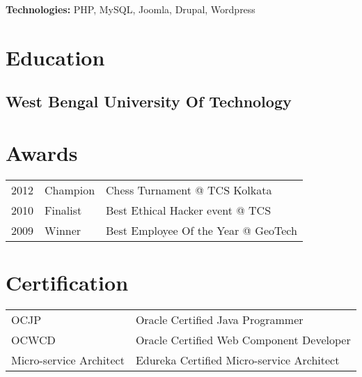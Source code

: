 \documentclass[]{deedy-resume-openfont}
\begin{document}
\begin{minipage}[t]{0.66\textwidth}
\vspace{\topsep}
\begin{tightemize}
\item \textbf{Technologies:} PHP, MySQL, Joomla, Drupal, Wordpress
\end{tightemize}
\sectionsep



\section{Education} 

\subsection{West Bengal University Of Technology}
\sectionsep


\section{Awards} 
\begin{tabular}{rll}
2012	     & Champion  &  Chess Turnament @ TCS Kolkata\\
2010	     & Finalist  & Best Ethical Hacker event @ TCS\\
2009	     & Winner  & Best Employee Of the Year @ GeoTech\\
\end{tabular}
\sectionsep


\section{Certification} 
\begin{tabular}{ll}
OCJP & Oracle Certified Java Programmer\\
OCWCD &  Oracle Certified Web Component Developer \\
Micro-service Architect & Edureka Certified Micro-service Architect
\end{tabular}
\sectionsep

\end{minipage} 
\end{document}
